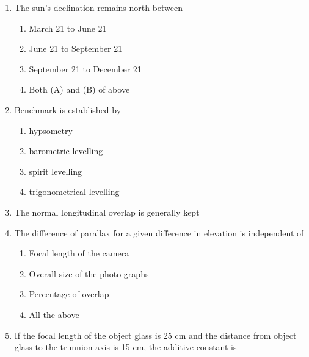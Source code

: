 \documentclass[11pt,a4paper]{article}
\begin{document}
\begin{enumerate}
\begin{enumerate}[label=\Alph*.]
\end{enumerate}
\item{The sun's declination remains north between}
\begin{enumerate}[label=\Alph*.]
\item{March 21 to June 21}
\item{June 21 to September 21}
\item{September 21 to December 21}
\item{Both (A) and (B) of above}
\end{enumerate}
\item{Benchmark is established by}
\begin{enumerate}[label=\Alph*.]
\item{hypsometry}
\item{barometric levelling}
\item{spirit levelling}
\item{trigonometrical levelling}
\end{enumerate}
\item{The normal longitudinal overlap is generally kept}
\\
\item{The difference of parallax for a given difference in elevation is independent of}
\begin{enumerate}[label=\Alph*.]
\item{Focal length of the camera}
\item{Overall size of the photo graphs}
\item{Percentage of overlap}
\item{All the above}
\end{enumerate}
\item{If the focal length of the object glass is 25 cm and the distance from object glass to the trunnion axis is 15 cm, the additive constant is}
\\

\end{enumerate}
\end{document}
